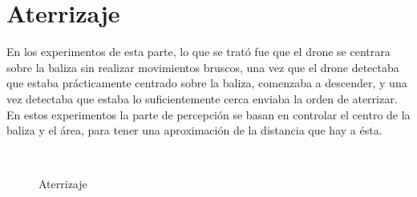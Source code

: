\section{Aterrizaje}

\hspace{1cm} En los experimentos de esta parte, lo que se trat\'o fue que el drone se centrara sobre la baliza sin realizar movimientos bruscos, una vez que el drone detectaba que estaba pr\'acticamente centrado sobre la baliza, comenzaba a descender, y una vez detectaba que estaba lo suficientemente cerca enviaba la orden de aterrizar. En estos experimentos la parte de percepci\'on se basan en controlar el centro de la baliza y el \'area, para tener una aproximaci\'on de la distancia que hay a \'esta. 

\begin{figure}[H]
 \centering
	\\
 \caption{Aterrizaje}
 \label{f:Aterrizaje sobre el simulador}
\end{figure}


